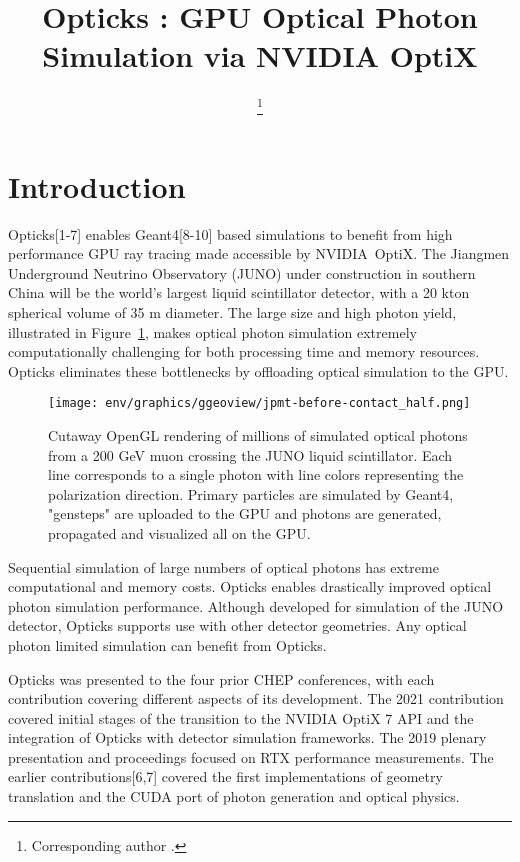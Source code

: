 \documentclass{webofc}
\begin{document}
\title{Opticks : GPU Optical Photon Simulation via NVIDIA OptiX}
\author{ \fnsep\thanks{Corresponding author .}}
\abstract{}
\maketitle
%
\section{Introduction}%
\label{intro}
%
Opticks[1-7] enables Geant4[8-10] based simulations 
to benefit from high performance GPU ray tracing made accessible 
by NVIDIA\textregistered\ OptiX\texttrademark[11-15].
%
The Jiangmen Underground Neutrino Observatory (JUNO)\cite{juno} 
under construction in southern China will be the world's largest liquid scintillator detector, 
with a 20 kton spherical volume of 35 m diameter. The large size and high photon yield, illustrated in Figure~\ref{problem}, 
makes optical photon simulation extremely computationally challenging for both processing time and memory resources. 
Opticks eliminates these bottlenecks by offloading optical simulation to the GPU. 
%
%
\begin{figure}
\centering
\texttt{[image: env/graphics/ggeoview/jpmt-before-contact\_half.png]}
\caption{Cutaway OpenGL rendering of millions of simulated optical photons from a 200 GeV muon crossing the JUNO liquid scintillator. 
Each line corresponds to a single photon with line colors representing the polarization direction. 
Primary particles are simulated by Geant4, "gensteps" are uploaded to the GPU and photons are generated, propagated
and visualized all on the GPU. 
}
\label{problem}
\end{figure}%
%
Sequential simulation of large numbers of 
optical photons has extreme computational and memory costs. 
Opticks enables drastically improved optical photon simulation performance.
%
Although developed for simulation of the JUNO detector, Opticks
supports use with other detector geometries. 
Any optical photon limited simulation can benefit from Opticks.

Opticks was presented to the four prior CHEP conferences, with each contribution
covering different aspects of its development. The 2021 contribution\cite{chep2021} 
covered initial stages of the transition to the NVIDIA OptiX 7 API and 
the integration of Opticks with detector simulation frameworks. 
The 2019 plenary presentation and proceedings\cite{chep2019} focused on RTX\cite{rtx} performance measurements.
The earlier contributions[6,7] covered the first 
implementations of geometry translation and the CUDA port of photon generation and optical physics.
\end{document}
